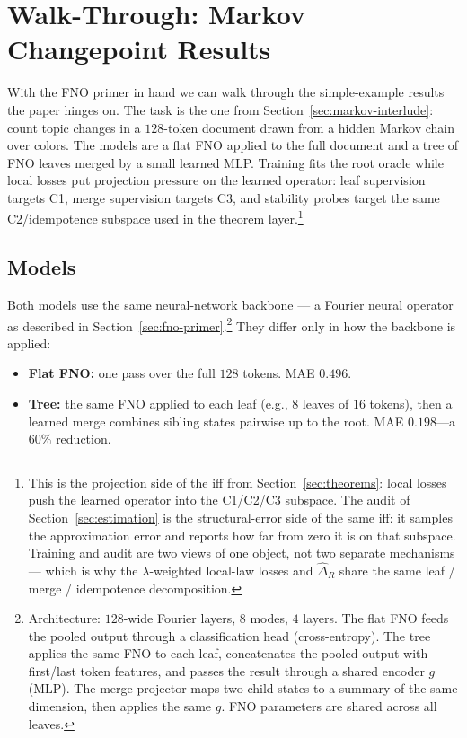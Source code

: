 \section{Walk-Through: Markov Changepoint Results}\label{sec:markov-walkthrough}

With the FNO primer in hand we can walk through the simple-example results the paper hinges on. The task is the one from Section~\ref{sec:markov-interlude}: count topic changes in a $128$-token document drawn from a hidden Markov chain over colors. The models are a flat FNO applied to the full document and a tree of FNO leaves merged by a small learned MLP. Training fits the root oracle while local losses put projection pressure on the learned operator: leaf supervision targets C1, merge supervision targets C3, and stability probes target the same C2/idempotence subspace used in the theorem layer.\footnote{This is the projection side of the iff from Section~\ref{sec:theorems}: local losses push the learned operator into the C1/C2/C3 subspace. The audit of Section~\ref{sec:estimation} is the structural-error side of the same iff: it samples the approximation error and reports how far from zero it is on that subspace. Training and audit are two views of one object, not two separate mechanisms --- which is why the $\lambda$-weighted local-law losses and $\hat\Delta_R$ share the same leaf / merge / idempotence decomposition.}

\subsection{Models}\label{sec:fno-baseline}

Both models use the same neural-network backbone --- a Fourier neural
operator as described in Section~\ref{sec:fno-primer}.\footnote{Architecture: $128$-wide Fourier layers, $8$ modes, $4$ layers. The flat FNO feeds the pooled output through a classification head (cross-entropy). The tree applies the same FNO to each leaf, concatenates the pooled output with first/last token features, and passes the result through a shared encoder $g$ (MLP). The merge projector maps two child states to a summary of the same dimension, then applies the same $g$. FNO parameters are shared across all leaves.} They differ only in how the backbone is applied:

\begin{itemize}[leftmargin=1.5em]
    \item \textbf{Flat FNO:} one pass over the full $128$ tokens. MAE $0.496$.
    \item \textbf{Tree:} the same FNO applied to each leaf (e.g., $8$ leaves of $16$ tokens), then a learned merge combines sibling states pairwise up to the root. MAE $0.198$---a $60\%$ reduction.
\end{itemize}


